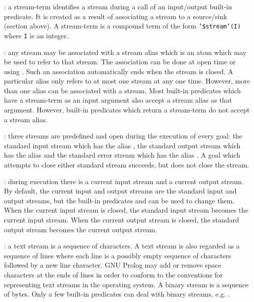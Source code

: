 : a stream-term identifies a stream during a call of an
input/output built-in predicate. It is created as a result of associating a
stream to a source/sink (section above). A stream-term is a compound term of
the form \texttt{'\$stream'(I)} where \texttt{I} is an integer.

: any stream may be associated with a stream alias
which is an atom which may be used to refer to that stream. The association
can be done at open time or using 
. Such an association automatically ends when the
stream is closed. A particular alias only refers to at most one stream at any
one time. However, more than one alias can be associated with a stream. Most
built-in predicates which have a stream-term as an input argument also accept
a stream alias as that argument. However, built-in predicates which return a
stream-term do not accept a stream alias.

: three streams are predefined and open during the
execution of every goal: the standard input stream which has the alias
, the standard output stream which has the alias
 and the standard error stream which has the alias
. A goal which attempts to close either standard stream
succeeds, but does not close the stream.

: during execution there is a current input stream
and a current output stream. By default, the current input and output
streams are the standard input and output streams, but the built-in
predicates   and
  can be used to change them.
When the current input stream is closed, the standard input stream becomes
the current input stream. When the current output stream is closed, the
standard output stream becomes the current output stream.

: a text stream is a sequence of
characters. A text stream is also regarded as a sequence of lines where each
line is a possibly empty sequence of characters followed by a new line
character. GNU Prolog may add or remove space characters at the ends of lines
in order to conform to the conventions for representing text streams in the
operating system. A binary stream is a sequence of bytes. Only a few
built-in predicates can deal with binary streams, e.g.
 .

